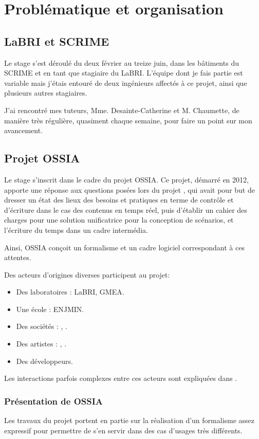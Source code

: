 \chapter{Problématique et organisation}
\section{LaBRI et SCRIME}
Le stage s'est déroulé du deux février au treize juin, dans les bâtiments du \ac{SCRIME} et en tant que stagiaire du \ac{LaBRI}. L'équipe dont je fais partie est variable mais j'étais entouré de deux ingénieurs affectés à ce projet, ainsi que plusieurs autres stagiaires.

J'ai rencontré mes tuteurs, Mme. Desainte-Catherine et M. Chaumette, de manière très régulière, quasiment chaque semaine, pour faire un point sur mon avancement.

\section{Projet OSSIA}
Le stage s'inscrit dans le cadre du projet  \ac{OSSIA}. Ce projet, démarré en 2012, apporte une réponse aux questions posées lors du projet , qui avait pour but de dresser un état des lieux des besoins et pratiques en terme de contrôle et d'écriture dans le cas des contenus en temps réel, puis d'établir un cahier des charges pour une solution unificatrice pour la conception de scénarios, et l'écriture du temps dans un cadre intermédia.

Ainsi, \ac{OSSIA} conçoit un formalisme et un cadre logiciel correspondant à ces attentes.

Des acteurs d'origines diverses participent au projet:
\begin{itemize}
	\item Des laboratoires : \ac{LaBRI}, \ac{GMEA}.
	\item Une école : \ac{ENJMIN}.
	\item Des sociétés : , .
	\item Des artistes : , .
	\item Des développeurs.
\end{itemize}

Les interactions parfois complexes entre ces acteurs sont expliquées dans \cite{meyssonnier2013analyse}.

\subsection{Présentation de \ac{OSSIA}}
Les travaux du projet portent en partie sur la réalisation d'un formalisme assez expressif pour permettre de s'en servir dans des cas d'usages très différents.

